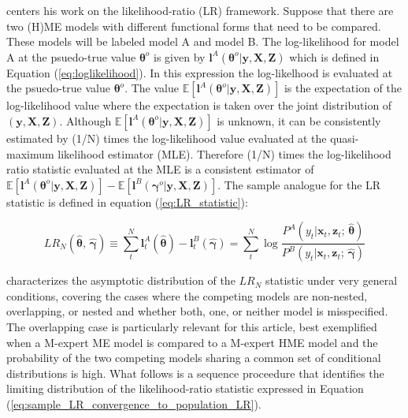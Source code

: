 \documentclass[12pt]{article}
\theoremstyle{definition}
\begin{document}
\citet{Voung1989} centers his work on the likelihood-ratio (LR) framework.
Suppose that there are two (H)ME models with different functional forms that need
to be compared. These models will be labeled model A and model B. The log-likelihood
for model A at the psuedo-true value $\boldsymbol{\theta}^{o}$ is given by
$\boldsymbol{l}^{A}(\boldsymbol{\theta}^{o}| \boldsymbol{y}, \boldsymbol{X}, \boldsymbol{Z})$
which is defined in Equation (\ref{eq:loglikelihood}). In this expression the log-likelhood is
evaluated at the psuedo-true value $\boldsymbol{\theta}^{o}$. The value
$\mathbb{E} \left[ \boldsymbol{l}^{A}(\boldsymbol{\theta}^{o}| \boldsymbol{y}, \boldsymbol{X}, \boldsymbol{Z}) \right]$
is the expectation of the log-likelihood value where the expectation is taken over the
joint distribution of $(\boldsymbol{y}, \boldsymbol{X}, \boldsymbol{Z})$. Although
$\mathbb{E} \left[ \boldsymbol{l}^{A}(\boldsymbol{\theta}^{o}| \boldsymbol{y}, \boldsymbol{X}, \boldsymbol{Z}) \right]$
is unknown, it can be consistently estimated by (1/N) times the log-likelihood
value evaluated at the quasi-maximum likelihood estimator (MLE). Therefore (1/N) times
the log-likelihood ratio statistic evaluated at the MLE is a consistent estimator of 
$\mathbb{E} \left[ \boldsymbol{l}^{A}(\boldsymbol{\theta}^{o}| \boldsymbol{y}, \boldsymbol{X}, \boldsymbol{Z}) \right] - \mathbb{E} \left[ \boldsymbol{l}^{B}(\boldsymbol{\gamma}^{o}| \boldsymbol{y}, \boldsymbol{X}, \boldsymbol{Z}) \right]$.
The sample analogue for the LR statistic is defined in equation (\ref{eq:LR_statistic}):

\begin{equation} \label{eq:LR_statistic}
  LR_{N} (\hat{\boldsymbol{\theta}}, \, \hat{\boldsymbol{\gamma}}) \equiv  \sum_{t}^{N} \boldsymbol{l}^{A}_{t}(\hat{\boldsymbol{\theta}}) - \boldsymbol{l}^{B}_{t}(\hat{\boldsymbol{\gamma}}) = \sum_{t}^{N} \log \frac{ P^{A}(y_{t} | \boldsymbol{x}_{t}, \boldsymbol{z}_{t}; \, \hat{\boldsymbol{\theta}}) }{ P^{B}(y_{t} | \boldsymbol{x}_{t}, \boldsymbol{z}_{t}; \, \hat{\boldsymbol{\gamma}}) }
\end{equation}

\citet{Voung1989} characterizes the asymptotic distribution of the $LR_{N}$ statistic under very general
conditions, covering the cases where the competing models are non-nested, overlapping,
or nested and whether both, one, or neither model is misspecified.
The overlapping case is particularly relevant for this article, best exemplified 
when a M-expert ME model is compared to a M-expert HME model and the probability
of the two competing models sharing a common set of conditional distributions
is high. What follows is a sequence proceedure that identifies the limiting
distribution of the likelihood-ratio statistic expressed in Equation
(\ref{eq:sample_LR_convergence_to_population_LR}).
\end{document}
